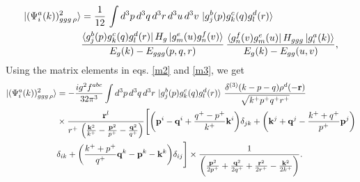 \documentclass[a4paper,11pt]{article}
\def\v#1{\mathbf{#1}}
\begin{document}
\begin{figure}[htbp]
    \centering
\end{figure}
\begin{align}
  \ket{(\Psi^{a}_{i}(k))^{2}_{ggg\,\rho}} & = \frac{1}{12}\,\int d^{3}p \, d^{3}q \, d^{3}r \, d^{3}u \, d^{3}v\, \ket{g^{b}_{j}(p)g^{c}_{k}(q)g^{d}_{l}(r)}\,\notag \\ &    \frac{\bra{g^{b}_{j}(p)g^{c}_{k}(q)g^{d}_{l}(r)}H_{g}\ket{g^{e}_{m}(u)g^{f}_{n}(v)}}{E_{g}(k)-E_{ggg}(p,q,r)}\, \frac{\bra{g^{f}_{n}(v)g^{e}_{m}(u)}H_{ggg}\ket{g^{a}_{i}(k)}}{E_{g}(k)-E_{gg}(u,v)},
\end{align}
Using the matrix elements in eqs. \eqref{m2} and \eqref{m3}, we get
\begin{align}
   \ket{(\Psi^{a}_{i}(k))^{2}_{ggg\,\rho}}  & = - \frac{ig^{2}f^{abc}}{32\pi^{3}}\int d^{3}p \, d^{3}q \, d^{3}r \, \ket{g^{b}_{j}(p)g^{c}_{k}(q)g^{d}_{l}(r)}\,\frac{\delta^{(3)}(k-p-q)\rho^{d}(-\v{r})}{\sqrt{k^{+}p^{+}q^{+}r^{+}}}\notag \\ &  \times \frac{\v{r}^{l}}{r^{+}\,\left(\frac{\v{k}^{2}}{k^{+}}-\frac{\v{p}^{2}}{p^{+}}-\frac{\v{q}^{2}}{q^{+}}\right)} \Bigg[\bigg(\v{p}^{i}-\v{q}^{i}+\frac{q^{+}-p^{+}}{k^{+}}\v{k}^{i}\bigg)\delta_{jk}+\bigg(\v{k}^{j}+\v{q}^{j}-\frac{k^{+}+q^{+}}{p^{+}}\v{p}^{j}\bigg)\notag \\ & \delta_{ik} +\bigg(\frac{k^{+}+p^{+}}{q^{+}}\v{q}^{k}-\v{p}^{k}-\v{k}^{k}\bigg)\delta_{ij}\Bigg] \times \frac{1}{\bigg(\frac{\v{p}^{2}}{2p^{+}}+\frac{\v{q}^{2}}{2q^{+}}+\frac{\v{r}^{2}}{2r^{+}}-\frac{\v{k}^{2}}{2k^{+}}\bigg)}.
\end{align}
\end{document}
